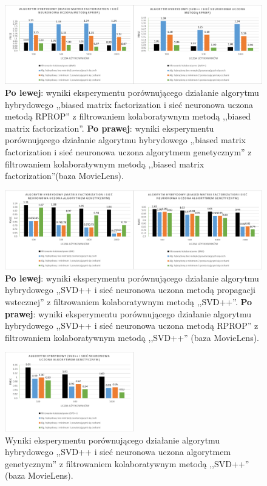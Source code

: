 \documentclass[twoside]{iisthesis}
\begin{document}
		\begin{figure}
			\centering
			\includegraphics[width=1\textwidth]{ml_exphybrid2_3}			
			\caption{\textbf{Po lewej}: wyniki eksperymentu porównującego działanie algorytmu hybrydowego ,,biased matrix factorization i sieć neuronowa uczona metodą RPROP'' z filtrowaniem kolaboratywnym metodą ,,biased matrix factorization''. \textbf{Po prawej}: wyniki eksperymentu porównującego działanie algorytmu hybrydowego ,,biased matrix factorization i sieć neuronowa uczona algorytmem genetycznym'' z filtrowaniem kolaboratywnym metodą ,,biased matrix factorization''(baza MovieLens).}
			\label{fig:ml_exphybrid2_3}
		\end{figure}
		
		\begin{figure}
			\centering
			\includegraphics[width=1\textwidth]{ml_exphybrid2_4}			
			\caption{\textbf{Po lewej}: wyniki eksperymentu porównującego działanie algorytmu hybrydowego ,,SVD++ i sieć neuronowa uczona metodą propagacji wstecznej'' z filtrowaniem kolaboratywnym metodą ,,SVD++''. \textbf{Po prawej}: wyniki eksperymentu porównującego działanie algorytmu hybrydowego ,,SVD++ i sieć neuronowa uczona metodą RPROP'' z filtrowaniem kolaboratywnym metodą ,,SVD++'' (baza MovieLens).}
			\label{fig:ml_exphybrid2_4}
		\end{figure}
		
		\begin{figure}
			\centering
			\includegraphics[width=0.5\textwidth]{ml_exphybrid2_5}			
			\caption{Wyniki eksperymentu porównującego działanie algorytmu hybrydowego ,,SVD++ i sieć neuronowa uczona algorytmem genetycznym'' z filtrowaniem kolaboratywnym metodą ,,SVD++'' (baza MovieLens).}
			\label{fig:ml_exphybrid2_5}
		\end{figure}
	
\end{document}
